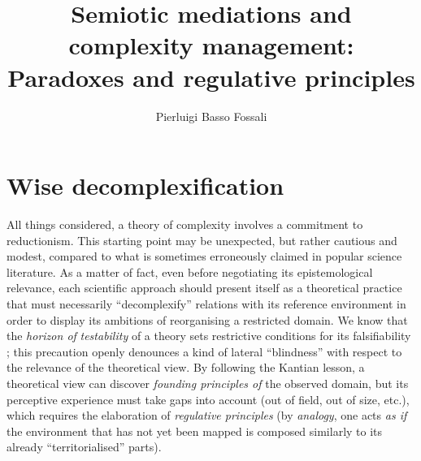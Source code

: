 \documentclass[output=paper]{langscibook}
\author{Pierluigi {Basso Fossali}\affiliation{UMR 5161 ICAR; Centre National de la Recherche Scientifique; Ecole Normale Supérieure; Université Lumière Lyon 2}}
\title[Semiotic mediations and complexity management]
      {Semiotic mediations and complexity management: Paradoxes and regulative principles}
\begin{document}
\maketitle 

\section{Wise decomplexification} \label{sec:2:1}

All things considered, a theory of complexity involves a commitment to reductionism. This starting point may be unexpected, but rather cautious and modest, compared to what is sometimes erroneously claimed in popular science literature. As a matter of fact, even before negotiating its epistemological relevance, each scientific approach should present itself as a theoretical practice that must necessarily “decomplexify” relations with its reference environment in order to display its ambitions of reorganising a restricted domain. We know that the \textit{horizon of} \textit{testability} of a theory sets restrictive conditions for its falsifiability \citep{Popper1972}; this precaution openly denounces a kind of lateral “blindness” with respect to the relevance of the theoretical view. By following the Kantian lesson, a theoretical view can discover \textit{founding principles of} the observed domain, but its perceptive experience must take gaps into account (out of field, out of size, etc.), which requires the elaboration of \textit{regulative principles} (by \textit{analogy}, one acts \textit{as if} the environment that has not yet been mapped is composed similarly to its already “territorialised” parts).\largerpage[1.5]
\end{document}
